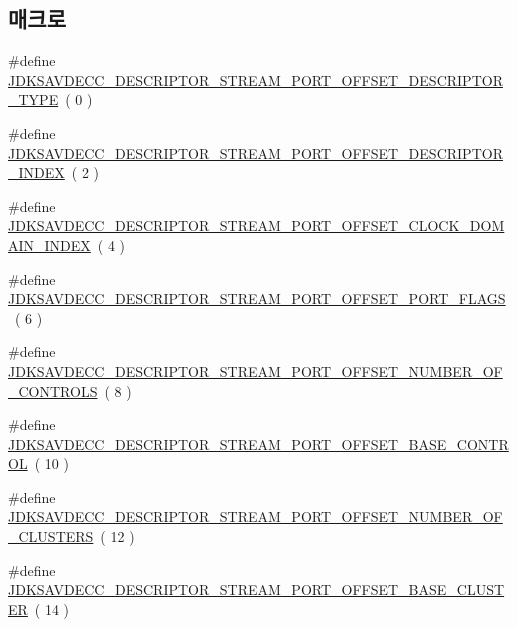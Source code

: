 \subsection*{매크로}
\begin{DoxyCompactItemize}
\item 
\#define \hyperlink{group__descriptor__stream__port_gaa2c091fdc0278338c617ddfb7e7d5690}{J\+D\+K\+S\+A\+V\+D\+E\+C\+C\+\_\+\+D\+E\+S\+C\+R\+I\+P\+T\+O\+R\+\_\+\+S\+T\+R\+E\+A\+M\+\_\+\+P\+O\+R\+T\+\_\+\+O\+F\+F\+S\+E\+T\+\_\+\+D\+E\+S\+C\+R\+I\+P\+T\+O\+R\+\_\+\+T\+Y\+PE}~( 0 )
\item 
\#define \hyperlink{group__descriptor__stream__port_gaf70639e574f693c20b7635c300612a5d}{J\+D\+K\+S\+A\+V\+D\+E\+C\+C\+\_\+\+D\+E\+S\+C\+R\+I\+P\+T\+O\+R\+\_\+\+S\+T\+R\+E\+A\+M\+\_\+\+P\+O\+R\+T\+\_\+\+O\+F\+F\+S\+E\+T\+\_\+\+D\+E\+S\+C\+R\+I\+P\+T\+O\+R\+\_\+\+I\+N\+D\+EX}~( 2 )
\item 
\#define \hyperlink{group__descriptor__stream__port_gab743c1465e9b47def43f997cc261735c}{J\+D\+K\+S\+A\+V\+D\+E\+C\+C\+\_\+\+D\+E\+S\+C\+R\+I\+P\+T\+O\+R\+\_\+\+S\+T\+R\+E\+A\+M\+\_\+\+P\+O\+R\+T\+\_\+\+O\+F\+F\+S\+E\+T\+\_\+\+C\+L\+O\+C\+K\+\_\+\+D\+O\+M\+A\+I\+N\+\_\+\+I\+N\+D\+EX}~( 4 )
\item 
\#define \hyperlink{group__descriptor__stream__port_gae4b81046675eb1bb48fdedc3d0532e9f}{J\+D\+K\+S\+A\+V\+D\+E\+C\+C\+\_\+\+D\+E\+S\+C\+R\+I\+P\+T\+O\+R\+\_\+\+S\+T\+R\+E\+A\+M\+\_\+\+P\+O\+R\+T\+\_\+\+O\+F\+F\+S\+E\+T\+\_\+\+P\+O\+R\+T\+\_\+\+F\+L\+A\+GS}~( 6 )
\item 
\#define \hyperlink{group__descriptor__stream__port_ga2a05d8d24ff8f4a9ef606b56cc53f132}{J\+D\+K\+S\+A\+V\+D\+E\+C\+C\+\_\+\+D\+E\+S\+C\+R\+I\+P\+T\+O\+R\+\_\+\+S\+T\+R\+E\+A\+M\+\_\+\+P\+O\+R\+T\+\_\+\+O\+F\+F\+S\+E\+T\+\_\+\+N\+U\+M\+B\+E\+R\+\_\+\+O\+F\+\_\+\+C\+O\+N\+T\+R\+O\+LS}~( 8 )
\item 
\#define \hyperlink{group__descriptor__stream__port_gab23c7cbdd4f79337bdb1092b05f9427a}{J\+D\+K\+S\+A\+V\+D\+E\+C\+C\+\_\+\+D\+E\+S\+C\+R\+I\+P\+T\+O\+R\+\_\+\+S\+T\+R\+E\+A\+M\+\_\+\+P\+O\+R\+T\+\_\+\+O\+F\+F\+S\+E\+T\+\_\+\+B\+A\+S\+E\+\_\+\+C\+O\+N\+T\+R\+OL}~( 10 )
\item 
\#define \hyperlink{group__descriptor__stream__port_ga8e53e8d62fd64305ee2ef172d6299228}{J\+D\+K\+S\+A\+V\+D\+E\+C\+C\+\_\+\+D\+E\+S\+C\+R\+I\+P\+T\+O\+R\+\_\+\+S\+T\+R\+E\+A\+M\+\_\+\+P\+O\+R\+T\+\_\+\+O\+F\+F\+S\+E\+T\+\_\+\+N\+U\+M\+B\+E\+R\+\_\+\+O\+F\+\_\+\+C\+L\+U\+S\+T\+E\+RS}~( 12 )
\item 
\#define \hyperlink{group__descriptor__stream__port_gab0727e3e5c98cc2806c8a22bace4e62a}{J\+D\+K\+S\+A\+V\+D\+E\+C\+C\+\_\+\+D\+E\+S\+C\+R\+I\+P\+T\+O\+R\+\_\+\+S\+T\+R\+E\+A\+M\+\_\+\+P\+O\+R\+T\+\_\+\+O\+F\+F\+S\+E\+T\+\_\+\+B\+A\+S\+E\+\_\+\+C\+L\+U\+S\+T\+ER}~( 14 )

\end{DoxyCompactItemize}
